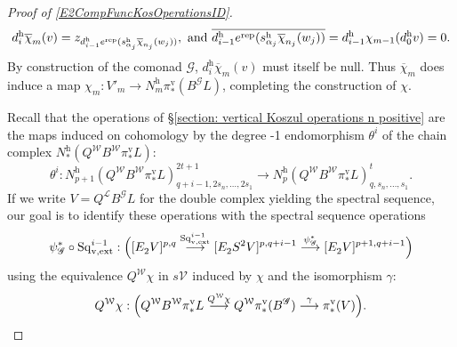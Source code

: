 \documentclass[11pt]{amsart} \renewcommand{\baselinestretch}{1.2}
\theoremstyle{plain}
\theoremstyle{definition}
\renewcommand{\to}{\longrightarrow}
\newcommand{\scrG}{\mathscr{G}}
\newcommand{\calL}{\mathcal{L}}
\newcommand{\calV}{\mathcal{V}}
\newcommand{\calw}{\mathcal{W}}
\newcommand{\vect}[2]{\calV^{#1}_{#2}}
\newcommand{\BSW}{{\scrG}}
\newcommand{\BSWres}{B^\BSW}%
\newcommand{\vExtCohOp}{\mathrm{Sq}_\mathrm{v,ext}}
\newcommand{\Edownup}[5]{[E_{#1}^{#2}#3]^{#4}_{#5}}
\newcommand{\uver}{^\mathrm{v}}
\newcommand{\uhor}{^\mathrm{h}}
\begin{document}
\begin{Operations in composite functor spectral sequences}
\begin{proof}[Proof of \ref{E2CompFuncKosOperationsID}]
\[d\uhor_i\overline{\chi}_m(v) =z_{d\uhor_{i-1}e^\textup{rep}(s\uhor_{\alpha_j}\overline{\chi}_{n_j}(w_j))}, \textup{ and }\overline{d\uhor_{i-1}e^\textup{rep}(s\uhor_{\alpha_j}\overline{\chi}_{n_j}(w_j))}=d\uhor_{i-1}\chi_{m-1}(d\uhor_0v)=0.\]
By construction of the comonad $\BSW$, $d\uhor_i\overline{\chi}_m(v)$ must itself be null. 
Thus $\overline{\chi}_m$ does induce a map $\chi_m:V'_m\to N\uhor_m\pi\uver_*(\BSWres L)$, completing the construction of $\chi$.

Recall that the operations of \S\ref{section: vertical Koszul operations n positive} are the maps induced on cohomology by the degree -1 endomorphism $\theta^i$ of the chain complex $N\uhor_*(Q^{\calw} B^{\calw}\pi\uver_*L)$:
\[\theta^i:N\uhor_{p+1}(Q^{\calw} B^{\calw}\pi\uver_*L)^{2t+1}_{q+i-1,2s_n,\ldots,2s_1}\to N\uhor_{p}(Q^{\calw} B^{\calw}\pi\uver_*L)^{t}_{q,s_n,\ldots,s_1}.\]
If we write $V=Q^{\calL}\BSWres L$ for the double complex yielding the spectral sequence, our goal is to identify these operations with the spectral sequence operations
\[\psi_\BSW^*\circ\vExtCohOp^{i-1}:\Bigl(\Edownup{2}{}{V}{p,q}{}\overset{\vExtCohOp^{i-1}}{\to} \Edownup{2}{}{S^2V}{p,q+i-1}{}\overset{\psi_\BSW^*}{\to}\Edownup{2}{}{V}{p+1,q+i-1}{}\Bigr)\]
using the equivalence $Q^{\calw}\chi$ in $s\vect{}{}$ induced by $\chi$ and the isomorphism $\gamma$:%
\[Q^{\calw}\chi:\Bigl(Q^{\calw}B^{\calw} \pi\uver_*L\overset{Q^{\calw}\chi}{\to} Q^{\calw}\pi\uver_*(\BSWres )\overset{\gamma}{\to}\pi\uver_*(V)\Bigr).\]


\end{proof}
\end{Operations in composite functor spectral sequences}
\end{document}
